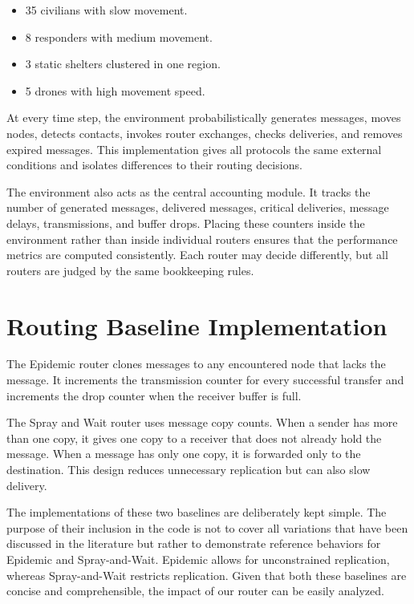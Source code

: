 \begin{itemize}
	\item 35 civilians with slow movement.
	\item 8 responders with medium movement.
	\item 3 static shelters clustered in one region.
	\item 5 drones with high movement speed.
\end{itemize}

At every time step, the environment probabilistically generates messages, moves nodes, detects contacts, invokes router exchanges, checks deliveries, and removes expired messages. This implementation gives all protocols the same external conditions and isolates differences to their routing decisions.

The environment also acts as the central accounting module. It tracks the number of generated messages, delivered messages, critical deliveries, message delays, transmissions, and buffer drops. Placing these counters inside the environment rather than inside individual routers ensures that the performance metrics are computed consistently. Each router may decide differently, but all routers are judged by the same bookkeeping rules.

\section{Routing Baseline Implementation}
The Epidemic router clones messages to any encountered node that lacks the message. It increments the transmission counter for every successful transfer and increments the drop counter when the receiver buffer is full.

The Spray and Wait router uses message copy counts. When a sender has more than one copy, it gives one copy to a receiver that does not already hold the message. When a message has only one copy, it is forwarded only to the destination. This design reduces unnecessary replication but can also slow delivery.

The implementations of these two baselines are deliberately kept simple. The purpose of their inclusion in the code is not to cover all variations that have been discussed in the literature but rather to demonstrate reference behaviors for Epidemic and Spray-and-Wait. Epidemic allows for unconstrained replication, whereas Spray-and-Wait restricts replication. Given that both these baselines are concise and comprehensible, the impact of our router can be easily analyzed.

